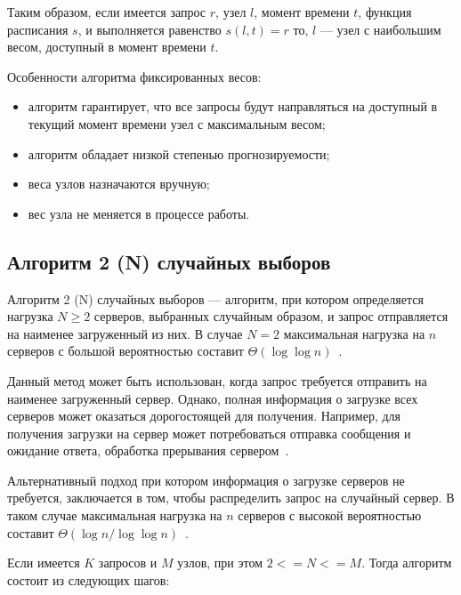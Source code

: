 Таким образом, если имеется запрос $r$, узел $l$, момент времени $t$, функция расписания $s$, и выполняется равенство $s(l, t) = r$ то, $l$ --- узел с наибольшим весом, доступный в момент времени $t$.

Особенности алгоритма фиксированных весов:
\begin{itemize}
	\item алгоритм гарантирует, что все запросы будут направляться на доступный в текущий момент времени узел с максимальным весом;
	\item алгоритм обладает низкой степенью прогнозируемости;
	\item веса узлов назначаются вручную;
	\item вес узла не меняется в процессе работы.
\end{itemize}

\subsection{Алгоритм 2 (N) случайных выборов}

Алгоритм 2 (N) случайных выборов --- алгоритм, при котором определяется нагрузка $N \ge 2$ серверов, выбранных случайным образом, и запрос отправляется на наименее загруженный из них. 
В случае $N=2$ максимальная нагрузка на $n$ серверов с большой вероятностью составит $\Theta(\log  \log n)$~\cite{pwr2choices}.

Данный метод может быть использован, когда запрос требуется отправить на наименее загруженный сервер. 
Однако, полная информация о загрузке всех серверов может оказаться дорогостоящей для получения. 
Например, для получения загрузки на сервер может потребоваться отправка сообщения и ожидание ответа, 
обработка прерывания сервером~\cite{pwr2choices}.

Альтернативный подход при котором информация о загрузке серверов не требуется, заключается в том, чтобы распределить запрос на случайный сервер.
В таком случае максимальная нагрузка на $n$ серверов с высокой вероятностью составит $\Theta(\log n / \log \log n)$~\cite{pwr2choices}.

Если имеется $K$ запросов и $M$ узлов, при этом $2 <= N <= M$. Тогда алгоритм состоит из следующих шагов:

